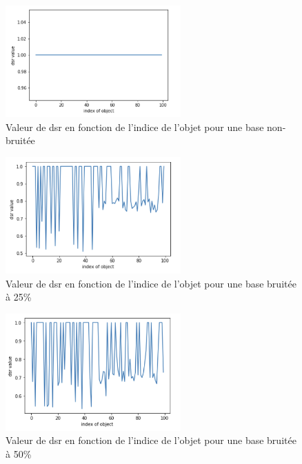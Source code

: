 \documentclass[a4paper]{article}
\begin{document}
\begin{figure}[H]
	\center 
	\includegraphics[width=0.6\textwidth]{images/dsr_0.png}
    \caption{Valeur de dsr en fonction de l'indice de l'objet pour une base
    non-bruitée}
    \label{img:dsr0}
\end{figure}

\begin{figure}[H]
	\center 
	\includegraphics[width=0.6\textwidth]{images/dsr_25.png}
    \caption{Valeur de dsr en fonction de l'indice de l'objet pour une base
    bruitée à 25\%}
    \label{img:dsr25}
\end{figure}

\begin{figure}[H]
	\center 
	\includegraphics[width=0.6\textwidth]{images/dsr_50.png}
    \caption{Valeur de dsr en fonction de l'indice de l'objet pour une base
    bruitée à 50\%}
    \label{img:dsr50}
\end{figure}
\end{document}
